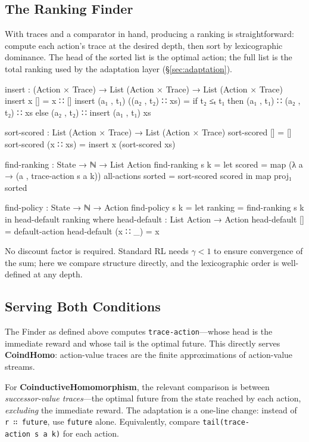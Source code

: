 \documentclass[9pt,a4paper]{article}
\theoremstyle{plain}
\theoremstyle{definition}
\theoremstyle{remark}
\begin{document}
\subsection{The Ranking Finder}

With traces and a comparator in hand, producing a ranking is straightforward: compute each action's trace at the desired depth, then sort by lexicographic dominance.  The head of the sorted list is the optimal action; the full list is the total ranking used by the adaptation layer (\S\ref{sec:adaptation}).

\begin{code}
  insert : (Action × Trace) → List (Action × Trace) → List (Action × Trace)
  insert x [] = x ∷ []
  insert (a₁ , t₁) ((a₂ , t₂) ∷ xs) =
    if t₂ ≤ₜ t₁
    then (a₁ , t₁) ∷ (a₂ , t₂) ∷ xs
    else (a₂ , t₂) ∷ insert (a₁ , t₁) xs

  sort-scored : List (Action × Trace) → List (Action × Trace)
  sort-scored [] = []
  sort-scored (x ∷ xs) = insert x (sort-scored xs)

  find-ranking : State → ℕ → List Action
  find-ranking s k =
    let scored = map (λ a → (a , trace-action s a k)) all-actions
        sorted = sort-scored scored
    in map proj₁ sorted

  find-policy : State → ℕ → Action
  find-policy s k =
    let ranking = find-ranking s k
    in head-default ranking
    where
      head-default : List Action → Action
      head-default []      = default-action
      head-default (x ∷ _) = x
\end{code}

\noindent No discount factor is required.  Standard RL needs $\gamma < 1$ to ensure convergence of the sum; here we compare structure directly, and the lexicographic order is well-defined at any depth.

\subsection{Serving Both Conditions}

The Finder as defined above computes \texttt{trace-action}---whose head is the immediate reward and whose tail is the optimal future.  This directly serves \textbf{CoindHomo}: action-value traces are the finite approximations of action-value streams.

For \textbf{CoinductiveHomomorphism}, the relevant comparison is between \emph{successor-value traces}---the optimal future from the state reached by each action, \emph{excluding} the immediate reward.  The adaptation is a one-line change: instead of \texttt{r~∷~future}, use \texttt{future} alone.  Equivalently, compare \texttt{tail(trace-action~s~a~k)} for each action.
\end{document}
